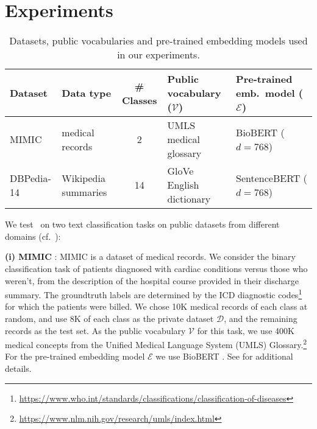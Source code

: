 


\section{Experiments}\label{sec:experiments}


\begin{table*}[t]
\centering
{\renewcommand{\arraystretch}{2}
\caption{Datasets, public vocabularies and pre-trained embedding models used in our experiments.} \label{tbl:datasets}
\begin{centering}
\small
\begin{tabular}{llcll}
\toprule
 \textbf{Dataset} & \textbf{Data type} & \textbf{\# Classes} & \textbf{Public vocabulary} ($\mathcal V$) & \textbf{Pre-trained emb.~model} ($\mathcal E$) \\
\midrule
MIMIC & medical records & 2 & UMLS medical glossary & BioBERT ($d=768$) \\
DBPedia-14 & Wikipedia summaries & 14 & GloVe English dictionary & SentenceBERT ($d=768$) \\
\bottomrule
\end{tabular}
\end{centering}}
\end{table*}

We test \alg\ on two text classification tasks on public datasets from different domains (cf.~):

\noindent\textbf{(i) MIMIC} \cite{goldberger2000physiobank}: MIMIC is a dataset of medical records. We consider the binary classification task of patients diagnosed with cardiac conditions versus those who weren't, from the description of the hospital course provided in their discharge summary. The groundtruth labels are determined by the ICD diagnostic codes\footnote{\url{https://www.who.int/standards/classifications/classification-of-diseases}} 
for which the patients were billed.
We chose 10K medical records of each class at random, and use 8K of each class as the private dataset $\mathcal D$, and the remaining records as the test set. 
As the public vocabulary $\mathcal V$ for this task, we use 400K medical concepts from the Unified Medical Language System (UMLS) Glossary.\footnote{\url{https://www.nlm.nih.gov/research/umls/index.html}}
For the pre-trained embedding model $\mathcal E$ we use BioBERT \cite{lee2020biobert}. See  for additional details.

